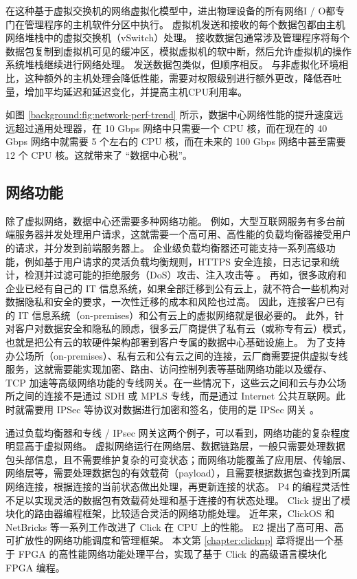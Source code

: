 在这种基于虚拟交换机的网络虚拟化模型中，进出物理设备的所有网络I / O都专门在管理程序的主机软件分区中执行。 虚拟机发送和接收的每个数据包都由主机网络堆栈中的虚拟交换机（vSwitch）处理。 接收数据包通常涉及管理程序将每个数据包复制到虚拟机可见的缓冲区，模拟虚拟机的软中断，然后允许虚拟机的操作系统堆栈继续进行网络处理。 发送数据包类似，但顺序相反。 与非虚拟化环境相比，这种额外的主机处理会降低性能，需要对权限级别进行额外更改，降低吞吐量，增加平均延迟和延迟变化，并提高主机CPU利用率。

如图 \ref{background:fig:network-perf-trend} 所示，数据中心网络性能的提升速度远远超过通用处理器，在 10 Gbps 网络中只需要一个 CPU 核，而在现在的 40 Gbps 网络中就需要 5 个左右的 CPU 核，而在未来的 100 Gbps 网络中甚至需要 12 个 CPU 核。这就带来了 ``数据中心税''。

\subsection{网络功能}

除了虚拟网络，数据中心还需要多种网络功能。
例如，大型互联网服务有多台前端服务器并发处理用户请求，这就需要一个高可用、高性能的负载均衡器接受用户的请求，并分发到前端服务器上。
企业级负载均衡器还可能支持一系列高级功能，例如基于用户请求的灵活负载均衡规则，HTTPS 安全连接，日志记录和统计，检测并过滤可能的拒绝服务（DoS）攻击、注入攻击等 \cite{ananta}。
再如，很多政府和企业已经有自己的 IT 信息系统，如果全部迁移到公有云上，就不符合一些机构对数据隐私和安全的要求，一次性迁移的成本和风险也过高。
因此，连接客户已有的 IT 信息系统（on-premises）和公有云上的虚拟网络就是很必要的。
此外，针对客户对数据安全和隐私的顾虑，很多云厂商提供了私有云（或称专有云）模式，也就是把公有云的软硬件架构部署到客户专属的数据中心基础设施上。
为了支持办公场所（on-premises）、私有云和公有云之间的连接，云厂商需要提供虚拟专线服务，这就需要能实现加密、路由、访问控制列表等基础网络功能以及缓存、TCP 加速等高级网络功能的专线网关。在一些情况下，这些云之间和云与办公场所之间的连接不是通过 SDH 或 MPLS 专线，而是通过 Internet 公共互联网。此时就需要用 IPSec 等协议对数据进行加密和签名，使用的是 IPSec 网关 \cite{son2017protego}。

通过负载均衡器和专线 / IPsec 网关这两个例子，可以看到，网络功能的复杂程度明显高于虚拟网络。
虚拟网络运行在网络层、数据链路层，一般只需要处理数据包头部信息，且不需要维护复杂的可变状态；而网络功能覆盖了应用层、传输层、网络层等，需要处理数据包的有效载荷（payload），且需要根据数据包查找到所属网络连接，根据连接的当前状态做出处理，再更新连接的状态。
P4 \cite{bosshart2013forwarding} 的编程灵活性不足以实现灵活的数据包有效载荷处理和基于连接的有状态处理。
Click \cite{kohler2000click} 提出了模块化的路由器编程框架，比较适合灵活的网络功能处理。
近年来，ClickOS \cite{martins2014clickos} 和 NetBricks \cite{netbricks} 等一系列工作改进了 Click 在 CPU 上的性能。
E2 \cite{palkar2015e2} 提出了高可用、高可扩放性的网络功能调度和管理框架。
本文第 \ref{chapter:clicknp} 章将提出一个基于 FPGA 的高性能网络功能处理平台，实现了基于 Click 的高级语言模块化 FPGA 编程。





